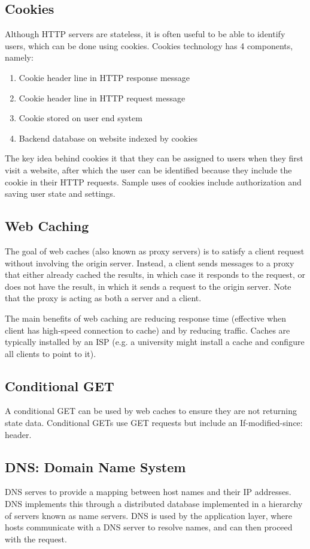 \documentclass[12pt,titlepage]{article}
\begin{document}
    \subsection{Cookies}
      Although HTTP servers are stateless, it is often useful to be able to identify users, which can be done using cookies. Cookies technology has 4 components, namely:
      \begin{enumerate}
        \item Cookie header line in HTTP response message
        \item Cookie header line in HTTP request message
        \item Cookie stored on user end system
        \item Backend database on website indexed by cookies
      \end{enumerate}
      The key idea behind cookies it that they can be assigned to users when they first visit a website, after which the user can be identified because they include the
      cookie in their HTTP requests. Sample uses of cookies include authorization and saving user state and settings.

    \subsection{Web Caching}
      The goal of web caches (also known as proxy servers) is to satisfy a client request without involving the origin server. Instead, a client sends messages to a proxy
      that either already cached the results, in which case it responds to the request, or does not have the result, in which it sends a request to the origin server. Note
      that the proxy is acting as both a server and a client.

      The main benefits of web caching are reducing response time (effective when client has high-speed connection to cache) and by reducing traffic. Caches are typically
      installed by an ISP (e.g. a university might install a cache and configure all clients to point to it).

    \subsection{Conditional GET}
      A conditional GET can be used by web caches to ensure they are not returning state data. Conditional GETs use GET requests but include an If-modified-since: header.

    \subsection{DNS: Domain Name System}
      DNS serves to provide a mapping between host names and their IP addresses. DNS implements this through a distributed database implemented in a hierarchy of servers
      known as name servers. DNS is used by the application layer, where hosts communicate with a DNS server to resolve names, and can then proceed with the request.
\end{document}
